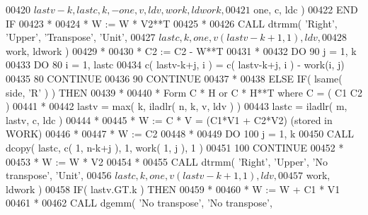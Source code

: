 \begin{DoxyCode}
00420      $                 lastv-k, lastc, k, -one, v, ldv, work, ldwork,
00421      $                 one, c, ldc )
00422 \textcolor{keywordflow}{               END IF}
00423 \textcolor{comment}{*}
00424 \textcolor{comment}{*              W := W * V2**T}
00425 \textcolor{comment}{*}
00426                \textcolor{keyword}{CALL }dtrmm( \textcolor{stringliteral}{'Right'}, \textcolor{stringliteral}{'Upper'}, \textcolor{stringliteral}{'Transpose'}, \textcolor{stringliteral}{'Unit'},
00427      $              lastc, k, one, v( lastv-k+1, 1 ), ldv,
00428      $              work, ldwork )
00429 \textcolor{comment}{*}
00430 \textcolor{comment}{*              C2 := C2 - W**T}
00431 \textcolor{comment}{*}
00432                \textcolor{keywordflow}{DO} 90 j = 1, k
00433                   \textcolor{keywordflow}{DO} 80 i = 1, lastc
00434                      c( lastv-k+j, i ) = c( lastv-k+j, i ) - work(i, j)
00435    80             \textcolor{keywordflow}{CONTINUE}
00436    90          \textcolor{keywordflow}{CONTINUE}
00437 \textcolor{comment}{*}
00438             \textcolor{keywordflow}{ELSE} \textcolor{keywordflow}{IF}( lsame( side, \textcolor{stringliteral}{'R'} ) ) \textcolor{keywordflow}{THEN}
00439 \textcolor{comment}{*}
00440 \textcolor{comment}{*              Form  C * H  or  C * H**T  where  C = ( C1  C2 )}
00441 \textcolor{comment}{*}
00442                lastv = max( k, iladlr( n, k, v, ldv ) )
00443                lastc = iladlr( m, lastv, c, ldc )
00444 \textcolor{comment}{*}
00445 \textcolor{comment}{*              W := C * V  =  (C1*V1 + C2*V2)  (stored in WORK)}
00446 \textcolor{comment}{*}
00447 \textcolor{comment}{*              W := C2}
00448 \textcolor{comment}{*}
00449                \textcolor{keywordflow}{DO} 100 j = 1, k
00450                   \textcolor{keyword}{CALL }dcopy( lastc, c( 1, n-k+j ), 1, work( 1, j ), 1 )
00451   100          \textcolor{keywordflow}{CONTINUE}
00452 \textcolor{comment}{*}
00453 \textcolor{comment}{*              W := W * V2}
00454 \textcolor{comment}{*}
00455                \textcolor{keyword}{CALL }dtrmm( \textcolor{stringliteral}{'Right'}, \textcolor{stringliteral}{'Upper'}, \textcolor{stringliteral}{'No transpose'}, \textcolor{stringliteral}{'Unit'},
00456      $              lastc, k, one, v( lastv-k+1, 1 ), ldv,
00457      $              work, ldwork )
00458                \textcolor{keywordflow}{IF}( lastv.GT.k ) \textcolor{keywordflow}{THEN}
00459 \textcolor{comment}{*}
00460 \textcolor{comment}{*                 W := W + C1 * V1}
00461 \textcolor{comment}{*}
00462                   \textcolor{keyword}{CALL }dgemm( \textcolor{stringliteral}{'No transpose'}, \textcolor{stringliteral}{'No transpose'},

\end{DoxyCode}
